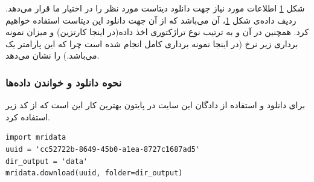 \begin{figure}[t!]
	\centering
	\removevspace[1]
	\caption{}
	\label{fig:mridata-org-fields}
\end{figure}

شکل \ref{fig:mridata-org-fields}
اطلاعات مورد نیاز جهت دانلود دیتاست مورد نظر را در اختیار ما قرار می‌دهد. ردیف داده‌ی شکل \ref{fig:mridata-org-fields}، 
آن می‌باشد که از آن جهت دانلود این دیتاست استفاده خواهیم کرد. همچنین در آن  و 
به ترتیب نوع تراژکتوری اخذ داده(در اینجا کارتزین) و میزان نمونه برداری زیر نرخ (در اینجا نمونه برداری کامل انجام شده است چرا که این پارامتر یک می‌باشد.) را نشان می‌دهد.

\subsubsection{نحوه دانلود و خواندن داده‌ها}

برای دانلود و استفاده از دادگان این سایت در پایتون بهترین کار این است که از کد زیر استفاده کرد.


\begin{latin}
\begin{lstlisting}
import mridata
uuid = 'cc52722b-8649-45b0-a1ea-8727c1687ad5'
dir_output = 'data'
mridata.download(uuid, folder=dir_output)
\end{lstlisting}
\end{latin}


